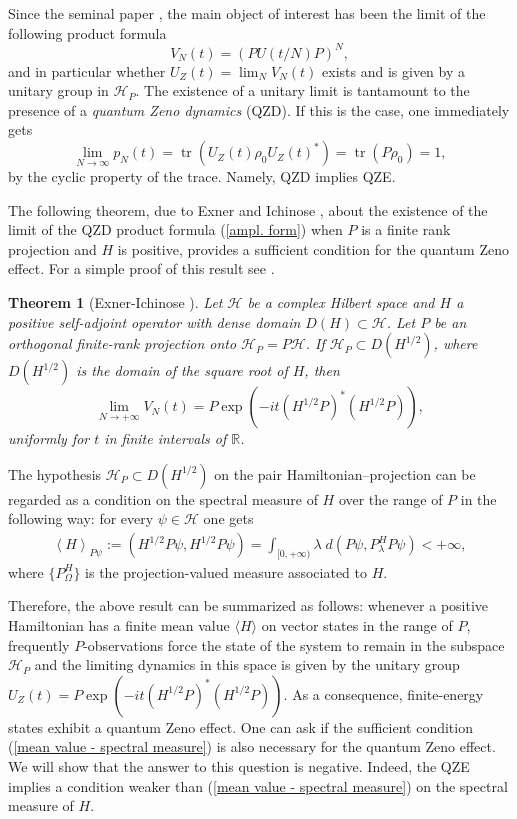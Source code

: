 \documentclass[aip,jmp
]{revtex4}
\newcommand{\tr}{\mathop{\mathrm{tr}}\nolimits}
\newcommand{\RM}{\mathbb{R}}
\newtheorem{theorem}{Theorem}
\theoremstyle{definition}
\begin{document}
Since the seminal paper \cite{misra}, the
main object of interest has been the limit of the
following product formula
\begin{equation}\label{ampl. form}
V_{N}(t)=(PU(t/N)P)^N ,
\end{equation}
and in particular whether $U_Z(t)= \lim_N V_N(t)$  exists and is given by a unitary group in
$\mathcal{H}_{P}$. The existence of a unitary limit is tantamount to the presence of a \emph{quantum Zeno dynamics} (QZD).
If this is the case, one immediately gets
\begin{equation*}
\lim_{N\to\infty} p_N(t)= \tr (U_Z(t)\rho_{0}U_Z(t)^{*})= \tr (P\rho_{0})=1,
\end{equation*}
by the cyclic property of the trace. Namely, QZD implies QZE.

The following theorem, due to Exner and Ichinose \cite{exner}, about the existence of the limit of the QZD product formula (\ref{ampl. form}) when $P$ is a finite rank projection and $H$ is positive, provides a sufficient condition for the quantum Zeno effect. For a simple proof of this result see \cite{EINZ}.

\begin{theorem}[Exner-Ichinose \cite{exner}]
\label{th:EI}
Let $\mathcal{H}$ be a complex Hilbert space and $H$ a
positive self-adjoint operator with dense domain $D(H)\subset \mathcal{H}$.
Let $P$ be an orthogonal finite-rank projection onto $\mathcal{H}_{P}=P\mathcal{H}$. If $\mathcal{H}_{P} \subset D(H^{1/2})$, where  $D(H^{1/2})$  is the domain of the square root of $H$,  then
\[
\lim_{N \to +\infty} V_{N}(t)= P\exp\left(-it(H^{1/2}P)^{*}(H^{1/2}P)\right) ,
\]
uniformly for $t$ in finite intervals of $\RM$.
\end{theorem}

The hypothesis $\mathcal{H}_{P} \subset D(H^{1/2})$ on the pair Hamiltonian--projection can be
regarded as a condition on the spectral measure of $H$ over the
range of $P$ in the following way: for every $\psi\in\mathcal{H}$ one gets
\begin{eqnarray}\label{mean value - spectral measure}
\left\langle H\right\rangle_{P\psi} := (H^{1/2}P \psi,H^{1/2}P \psi)
= \int_{[0, +\infty)} 
\lambda \; d(P \psi, P_{\lambda}^H P \psi) < +\infty ,
\end{eqnarray}
where $\{P_{\Omega}^H\}$ is the projection-valued measure associated
to $H$.

Therefore, the above result can be summarized as follows: whenever a positive Hamiltonian
has a finite mean value  $\langle H \rangle$ on vector states in the range of $P$, frequently
$P$-observations force the state of the system to remain in the
subspace $\mathcal{H}_{P}$ and the limiting dynamics in this space is given by
the unitary group $U_{Z}(t)=P \exp(-it(H^{1/2}P)^*(H^{1/2}P))$. As a consequence,
finite-energy states 
exhibit a quantum Zeno effect. One can ask if the sufficient condition (\ref{mean value - spectral measure}) is also necessary for the
quantum Zeno effect. We will show that the answer to this question is negative. Indeed,
the QZE implies a  condition weaker than (\ref{mean value - spectral
measure}) on the spectral measure of $H$.
\end{document}

